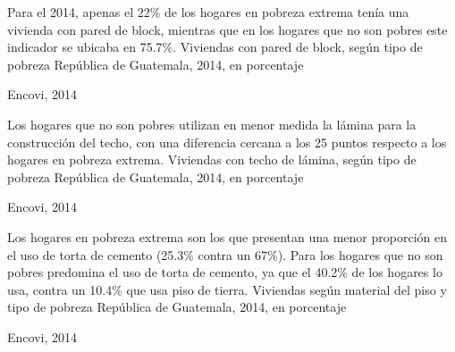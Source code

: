 
%
{%
	Para el 2014, apenas el 22\% de los hogares en pobreza extrema tenía una vivienda con pared de block, mientras que en los hogares que  no son pobres este indicador se ubicaba en 75.7\%. 
}%
{%
	Viviendas con pared de block, según tipo de pobreza} %
{%
	República de Guatemala, 2014, en porcentaje} %
{%
	\begin{tikzpicture}[x=1pt,y=1pt]    \end{tikzpicture}}%
{%
	Encovi, 2014} %


%
{%
Los hogares que no son pobres utilizan en menor medida la lámina para la construcción del techo, con una diferencia cercana a los 25 puntos respecto a los hogares en pobreza extrema. 
	}%
{%
	Viviendas con techo de lámina,  según tipo de pobreza} %
{%
	República de Guatemala, 2014, en porcentaje} %
{%
	\begin{tikzpicture}[x=1pt,y=1pt]    \end{tikzpicture}}%
{%
	Encovi, 2014} %


%
{%
	Los hogares en   pobreza extrema son los que presentan una menor proporción en el uso de torta de cemento (25.3\% contra un 67\%). Para los hogares que no son pobres predomina el uso de torta de cemento, ya que el 40.2\% de los hogares lo usa, contra un 10.4\% que usa piso de tierra. 
}%
{%
	Viviendas según material del piso y tipo de pobreza} %
{%
	República de Guatemala, 2014, en porcentaje} %
{%
	\begin{tikzpicture}[x=1pt,y=1pt]    \end{tikzpicture}}%
{%
	Encovi, 2014} %

